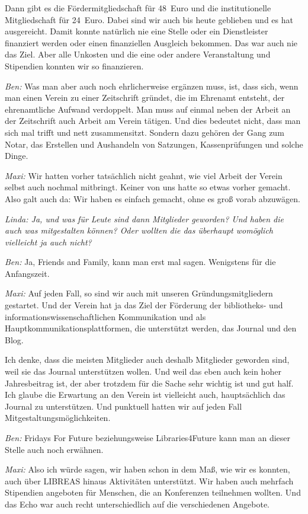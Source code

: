 \documentclass[a4paper,
fontsize=11pt,
oneside,
numbers=noperiodatend,
parskip=half-,
bibliography=totoc,
final
]{scrartcl}
\begin{document}
Dann gibt es die Fördermitgliedschaft für 48~Euro und die
institutionelle Mitgliedschaft für 24~Euro. Dabei sind wir auch bis
heute geblieben und es hat ausgereicht. Damit konnte natürlich nie eine
Stelle oder ein Dienstleister finanziert werden oder einen finanziellen
Ausgleich bekommen. Das war auch nie das Ziel. Aber alle Unkosten und
die eine oder andere Veranstaltung und Stipendien konnten wir so
finanzieren.

\emph{Ben:} Was man aber auch noch ehrlicherweise ergänzen muss, ist,
dass sich, wenn man einen Verein zu einer Zeitschrift gründet, die im
Ehrenamt entsteht, der ehrenamtliche Aufwand verdoppelt. Man muss auf
einmal neben der Arbeit an der Zeitschrift auch Arbeit am Verein
tätigen. Und dies bedeutet nicht, dass man sich mal trifft und nett
zusammensitzt. Sondern dazu gehören der Gang zum Notar, das Erstellen
und Aushandeln von Satzungen, Kassenprüfungen und solche Dinge.

\emph{Maxi:} Wir hatten vorher tatsächlich nicht geahnt, wie viel Arbeit
der Verein selbst auch nochmal mitbringt. Keiner von uns hatte so etwas
vorher gemacht. Also galt auch da: Wir haben es einfach gemacht, ohne es
groß vorab abzuwägen.

\emph{Linda: Ja, und was für Leute sind dann Mitglieder geworden? Und
haben die auch was mitgestalten können? Oder wollten die das überhaupt
womöglich vielleicht ja auch nicht?}

\emph{Ben:} Ja, Friends and Family, kann man erst mal sagen. Wenigstens
für die Anfangszeit.

\emph{Maxi:} Auf jeden Fall, so sind wir auch mit unseren
Gründungsmitgliedern gestartet. Und der Verein hat ja das Ziel der
Förderung der bibliotheks- und informationswissenschaftlichen
Kommunikation und als Hauptkommunikationsplattformen, die unterstützt
werden, das Journal und den Blog.

Ich denke, dass die meisten Mitglieder auch deshalb Mitglieder geworden
sind, weil sie das Journal unterstützen wollen. Und weil das eben auch
kein hoher Jahresbeitrag ist, der aber trotzdem für die Sache sehr
wichtig ist und gut half. Ich glaube die Erwartung an den Verein ist
vielleicht auch, hauptsächlich das Journal zu unterstützen. Und
punktuell hatten wir auf jeden Fall Mitgestaltungsmöglichkeiten.

\emph{Ben:} Fridays For Future beziehungsweise Libraries4Future kann man
an dieser Stelle auch noch erwähnen.

\emph{Maxi:} Also ich würde sagen, wir haben schon in dem Maß, wie wir
es konnten, auch über LIBREAS hinaus Aktivitäten unterstützt. Wir haben
auch mehrfach Stipendien angeboten für Menschen, die an Konferenzen
teilnehmen wollten. Und das Echo war auch recht unterschiedlich auf die
verschiedenen Angebote.
\end{document}
